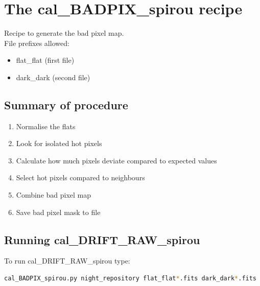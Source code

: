 

\clearpage
\newpage
\section{The cal\_BADPIX\_spirou recipe}
\label{section:cal_BADPIX_spirou}

Recipe to generate the bad pixel map. \\


\noindent File prefixes allowed:
\begin{itemize}
	\item flat\_flat (first file)
	\item dark\_dark (second file)
\end{itemize}

\subsection{Summary of procedure}
\begin{enumerate}
	\item Normalise the flats
	\item Look for isolated hot pixels
	\item Calculate how much pixels deviate compared to expected values
	\item Select hot pixels compared to neighbours
	\item Combine bad pixel map
	\item Save bad pixel mask to file
\end{enumerate}

\subsection{Running cal\_DRIFT\_RAW\_spirou}

To run cal\_DRIFT\_RAW\_spirou type:
\begin{lstlisting}[language=bash, style=bashstyle]
cal_BADPIX_spirou.py night_repository flat_flat*.fits dark_dark*.fits
\end{lstlisting}


